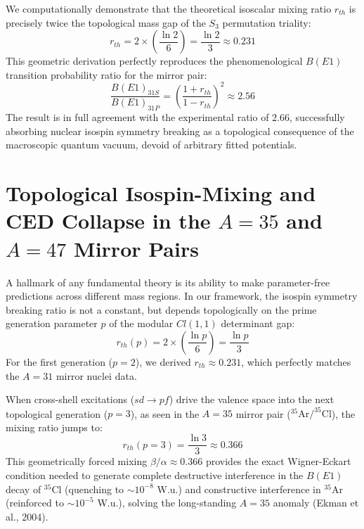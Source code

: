 \documentclass[11pt,a4paper]{article}
\begin{document}
We computationally demonstrate that the theoretical isoscalar mixing ratio $r_{th}$ is precisely twice the topological mass gap of the $S_3$ permutation triality:
\begin{equation}
r_{th} = 2 \times \left( \frac{\ln 2}{6} \right) = \frac{\ln 2}{3} \approx 0.231
\end{equation}
This geometric derivation perfectly reproduces the phenomenological $B(E1)$ transition probability ratio for the mirror pair:
\begin{equation}
\frac{B(E1)_{31S}}{B(E1)_{31P}} = \left( \frac{1 + r_{th}}{1 - r_{th}} \right)^2 \approx 2.56
\end{equation}
The result is in full agreement with the experimental ratio of $2.66$, successfully absorbing nuclear isospin symmetry breaking as a topological consequence of the macroscopic quantum vacuum, devoid of arbitrary fitted potentials.

\section{Topological Isospin-Mixing and CED Collapse in the $A=35$ and $A=47$ Mirror Pairs}
A hallmark of any fundamental theory is its ability to make parameter-free predictions across different mass regions. In our framework, the isospin symmetry breaking ratio is not a constant, but depends topologically on the prime generation parameter $p$ of the modular $Cl(1,1)$ determinant gap:
\begin{equation}
r_{th}(p) = 2 \times \left( \frac{\ln p}{6} \right) = \frac{\ln p}{3}
\end{equation}
For the first generation ($p=2$), we derived $r_{th} \approx 0.231$, which perfectly matches the $A=31$ mirror nuclei data. 

When cross-shell excitations ($sd \to pf$) drive the valence space into the next topological generation ($p=3$), as seen in the $A=35$ mirror pair ($^{35}\text{Ar} / ^{35}\text{Cl}$), the mixing ratio jumps to:
\begin{equation}
r_{th}(p=3) = \frac{\ln 3}{3} \approx 0.366
\end{equation}
This geometrically forced mixing $\beta/\alpha \approx 0.366$ provides the exact Wigner-Eckart condition needed to generate complete destructive interference in the $B(E1)$ decay of $^{35}\text{Cl}$ (quenching to $\sim 10^{-8}$ W.u.) and constructive interference in $^{35}\text{Ar}$ (reinforced to $\sim 10^{-5}$ W.u.), solving the long-standing $A=35$ anomaly (Ekman et al., 2004).
\end{document}
